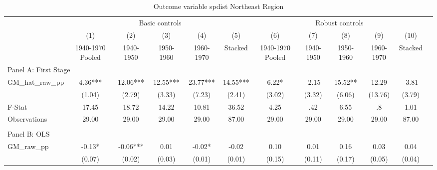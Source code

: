  \begin{table}[htbp]\centering {} \begin{threeparttable} \caption{Outcome variable spdist Northeast Region} \begin{tabular}{l*{11}{c}} \toprule
          &\multicolumn{5}{c}{Basic controls}                                   &\multicolumn{5}{c}{Robust controls}                                  \\\cmidrule(lr){2-6}\cmidrule(lr){7-11}
          &\multicolumn{1}{c}{(1)}&\multicolumn{1}{c}{(2)}&\multicolumn{1}{c}{(3)}&\multicolumn{1}{c}{(4)}&\multicolumn{1}{c}{(5)}&\multicolumn{1}{c}{(6)}&\multicolumn{1}{c}{(7)}&\multicolumn{1}{c}{(8)}&\multicolumn{1}{c}{(9)}&\multicolumn{1}{c}{(10)}\\
          &\multicolumn{1}{c}{1940-1970 Pooled}&\multicolumn{1}{c}{1940-1950}&\multicolumn{1}{c}{1950-1960}&\multicolumn{1}{c}{1960-1970}&\multicolumn{1}{c}{Stacked}&\multicolumn{1}{c}{1940-1970 Pooled}&\multicolumn{1}{c}{1940-1950}&\multicolumn{1}{c}{1950-1960}&\multicolumn{1}{c}{1960-1970}&\multicolumn{1}{c}{Stacked}\\
\cmidrule(lr){1-11}
\multicolumn{10}{l}{Panel A: First Stage}\\
\cmidrule(lr){1-11}
GM\_hat\_raw\_pp&      4.36***&     12.06***&     12.55***&     23.77***&     14.55***&      6.22*  &     -2.15   &     15.52** &     12.29   &     -3.81   \\
          &    (1.04)   &    (2.79)   &    (3.33)   &    (7.23)   &    (2.41)   &    (3.02)   &    (3.32)   &    (6.06)   &   (13.76)   &    (3.79)   \\
\midrule
F-Stat    &     17.45   &     18.72   &     14.22   &     10.81   &     36.52   &      4.25   &       .42   &      6.55   &        .8   &      1.01   \\
Observations&     29.00   &     29.00   &     29.00   &     29.00   &     87.00   &     29.00   &     29.00   &     29.00   &     29.00   &     87.00   \\
\cmidrule[\heavyrulewidth](lr){1-11} \\ \cmidrule[\heavyrulewidth](lr){1-11}
\multicolumn{10}{l}{Panel B: OLS}\\
\cmidrule(lr){1-11}
GM\_raw\_pp &     -0.13*  &     -0.06***&      0.01   &     -0.02*  &     -0.02   &      0.10   &      0.01   &      0.16   &      0.03   &      0.04   \\
          &    (0.07)   &    (0.02)   &    (0.03)   &    (0.01)   &    (0.01)   &    (0.15)   &    (0.11)   &    (0.17)   &    (0.05)   &    (0.04)   \\

\end{tabular}
\end{threeparttable}
\end{table}
